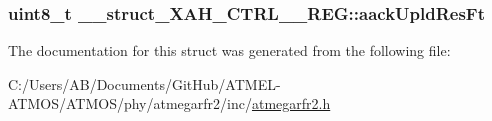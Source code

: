 \hypertarget{struct____struct___x_a_h___c_t_r_l__1___r_e_g_a47d950ecbdd3c5aa3944ab363d20add4}{
\subsubsection[{aack\-Upld\-Res\-Ft}]{\setlength{\rightskip}{0pt plus 5cm}uint8\-\_\-t \-\_\-\-\_\-struct\-\_\-\-X\-A\-H\-\_\-\-C\-T\-R\-L\-\_\-\_\-\-R\-E\-G\-::aack\-Upld\-Res\-Ft}}\label{struct____struct___x_a_h___c_t_r_l__1___r_e_g_a47d950ecbdd3c5aa3944ab363d20add4}


The documentation for this struct was generated from the following file\-:\begin{DoxyCompactItemize}
\item 
C\-:/\-Users/\-A\-B/\-Documents/\-Git\-Hub/\-A\-T\-M\-E\-L-\/\-A\-T\-M\-O\-S/\-A\-T\-M\-O\-S/phy/atmegarfr2/inc/\hyperlink{atmegarfr2_8h}{atmegarfr2.\-h}\end{DoxyCompactItemize}
